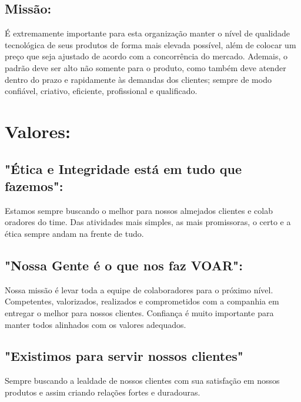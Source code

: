 \subsection{Missão:}
	É extremamente importante para esta organização manter o nível de qualidade tecnológica de seus produtos de forma mais elevada possível, além de colocar um preço que seja ajustado de acordo com a concorrência do mercado.
Ademais, o padrão deve ser alto não somente para o produto, como também deve atender dentro do prazo e rapidamente às demandas dos clientes; sempre de modo confiável, criativo, eficiente, profissional e qualificado.

	
    \section{Valores:}
	    \begin{description}
	    \subsection{"Ética e Integridade está em tudo que fazemos":} 
        Estamos sempre buscando o melhor para nossos almejados clientes e colab
        oradores do time. Das atividades mais simples, as mais promissoras, o certo e a
        ética sempre andam na frente de tudo.
        \end{description}

        \begin{description}
            \subsection{"Nossa Gente é o que nos faz VOAR":} 
            Nossa missão é levar toda a equipe de colaboradores para o próximo nível.
             Competentes, valorizados, realizados e comprometidos com a companhia em entregar o melhor para nossos clientes.
              Confiança é muito importante para manter todos alinhados com os valores adequados.
            \end{description}

            \begin{description}
                \subsection{"Existimos para servir nossos clientes"} 
                Sempre buscando a lealdade de nossos clientes com
                sua satisfação em nossos produtos e assim criando relações fortes e duradouras.
                \end{description}


